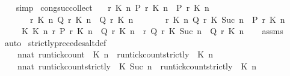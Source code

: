 \begin{isabellebody}
\ {\isacharasterisk}\ \isamarkupfalse%
\ simp\isanewline
{}\isamarkupfalse%
%
\endisatagproof
{\isafoldproof}%
%
\isadelimproof
\isanewline
%
\endisadelimproof
\isanewline
{}\isamarkupfalse%
\ cong{\isacharunderscore}suc{\isacharunderscore}collect{\isacharcolon}\isanewline
\ \ \ {\isacartoucheopen}{\isasymAnd}r\ K\ n{\isachardot}\ P\ r\ K\ n\ {\isacharequal}\ P{\isacharprime}\ r\ K\ n{\isacartoucheclose}\isanewline
\ \ \ \ \ \ \ {\isacartoucheopen}{\isasymAnd}r\ K\ n{\isachardot}\ Q\ r\ K\ n\ {\isacharequal}\ Q{\isacharprime}\ r\ K\ n{\isacartoucheclose}\isanewline
\ \ \ \ \ \ \ {\isacartoucheopen}{\isasymAnd}r\ K\ n{\isachardot}\ Q\ r\ K\ {\isacharparenleft}Suc\ n{\isacharparenright}\ {\isacharequal}\ P\ r\ K\ n{\isacartoucheclose}\isanewline
\ \ \ \ \ {\isacartoucheopen}{\isasymAnd}K\ K\ n{\isachardot}\ {\isacharbraceleft}r{\isachardot}\ P{\isacharprime}\ r\ K\ n\ {\isasymle}\ Q{\isacharprime}\ r\ K\ n{\isacharbraceright}\ {\isacharequal}\ {\isacharbraceleft}r{\isachardot}\ Q{\isacharprime}\ r\ K\ {\isacharparenleft}Suc\ n{\isacharparenright}\ {\isasymle}\ Q{\isacharprime}\ r\ K\ n{\isacharbraceright}{\isacartoucheclose}\isanewline
%
\isadelimproof
\ \ %
\endisadelimproof
%
\isatagproof
{}\isamarkupfalse%
\ assms\ \isamarkupfalse%
\ auto%
\endisatagproof
{\isafoldproof}%
%
\isadelimproof
\isanewline
%
\endisadelimproof
\isanewline
{}\isamarkupfalse%
\ strictly{\isacharunderscore}precedes{\isacharunderscore}alt{\isacharunderscore}def{}{\isacharcolon}\isanewline
\ \ {\isacartoucheopen}{\isacharbraceleft}\ {\isasymrho}{\isachardot}\ {\isasymforall}n{\isacharcolon}{\isacharcolon}nat{\isachardot}\ {\isacharparenleft}run{\isacharunderscore}tick{\isacharunderscore}count\ {\isasymrho}\ K\ n{\isacharparenright}\ {\isasymle}\ {\isacharparenleft}run{\isacharunderscore}tick{\isacharunderscore}count{\isacharunderscore}strictly\ {\isasymrho}\ K\ n{\isacharparenright}\ {\isacharbraceright}\isanewline
\ {\isacharequal}\ {\isacharbraceleft}\ {\isasymrho}{\isachardot}\ {\isasymforall}n{\isacharcolon}{\isacharcolon}nat{\isachardot}\ {\isacharparenleft}run{\isacharunderscore}tick{\isacharunderscore}count{\isacharunderscore}strictly\ {\isasymrho}\ K\ {\isacharparenleft}Suc\ n{\isacharparenright}{\isacharparenright}\ {\isasymle}\ {\isacharparenleft}run{\isacharunderscore}tick{\isacharunderscore}count{\isacharunderscore}strictly\ {\isasymrho}\ K\ n{\isacharparenright}\ {\isacharbraceright}{\isacartoucheclose}\isanewline

\end{isabellebody}
